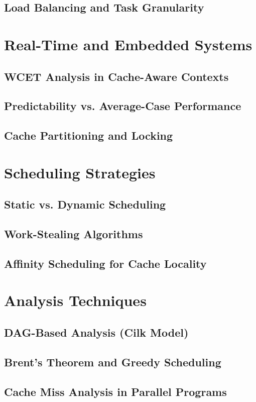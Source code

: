 \subsection{Load Balancing and Task Granularity}

\section{Real-Time and Embedded Systems}
\subsection{WCET Analysis in Cache-Aware Contexts}
\subsection{Predictability vs. Average-Case Performance}
\subsection{Cache Partitioning and Locking}

\section{Scheduling Strategies}
\subsection{Static vs. Dynamic Scheduling}
\subsection{Work-Stealing Algorithms}
\subsection{Affinity Scheduling for Cache Locality}

\section{Analysis Techniques}
\subsection{DAG-Based Analysis (Cilk Model)}
\subsection{Brent's Theorem and Greedy Scheduling}
\subsection{Cache Miss Analysis in Parallel Programs}

